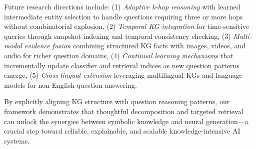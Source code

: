 \documentclass[conference]{IEEEtran}
\begin{document}
Future research directions include: (1) \emph{Adaptive k-hop reasoning} with learned intermediate entity selection to handle questions requiring three or more hops without combinatorial explosion, (2) \emph{Temporal KG integration} for time-sensitive queries through snapshot indexing and temporal consistency checking, (3) \emph{Multi-modal evidence fusion} combining structured KG facts with images, videos, and audio for richer question domains, (4) \emph{Continual learning mechanisms} that incrementally update classifier and retrieval indices as new question patterns emerge, (5) \emph{Cross-lingual extension} leveraging multilingual KGs and language models for non-English question answering.

By explicitly aligning KG structure with question reasoning patterns, our framework demonstrates that thoughtful decomposition and targeted retrieval can unlock the synergies between symbolic knowledge and neural generation—a crucial step toward reliable, explainable, and scalable knowledge-intensive AI systems.



\end{document}
